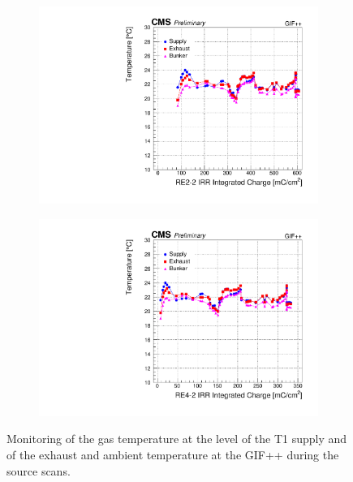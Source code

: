 	\begin{figure}[H]
    	\begin{subfigure}{0.5\linewidth}
    		\centering
			\includegraphics[width = \linewidth]{fig/chapt5/RE2-2-Temperature-monitoring.pdf}
        	\caption{\label{fig:GIFpp-Temperature:A}}
    	\end{subfigure}
    	\begin{subfigure}{0.5\linewidth}
			\centering
    		\includegraphics[width = \linewidth]{fig/chapt5/RE4-2-Temperature-monitoring.pdf}
        	\caption{\label{fig:GIFpp-Temperature:B}}
    	\end{subfigure}
		\caption{\label{fig:GIFpp-Temperature} Monitoring of the gas temperature at the level of the T1 supply and of the exhaust and ambient temperature at the GIF++ during the source scans.}
	\end{figure}

